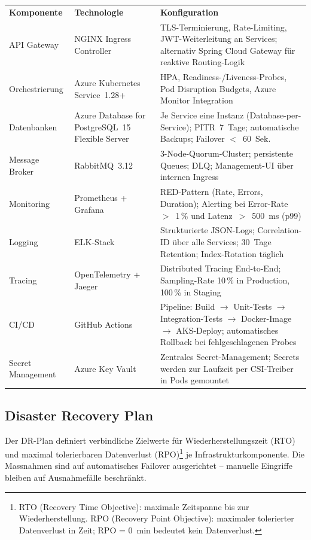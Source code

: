 \begin{tabularx}{\textwidth}{L{3.2cm} L{3cm} X}
  \color{white}\textbf{Komponente} & \color{white}\textbf{Technologie} & \color{white}\textbf{Konfiguration} \\
  API Gateway & NGINX Ingress Controller & TLS-Terminierung, Rate-Limiting, JWT-Weiterleitung an Services;
  alternativ Spring Cloud Gateway für reaktive Routing-Logik \\
  Orchestrierung & Azure Kubernetes Service~1.28+ & HPA, Readiness-/Liveness-Probes, Pod Disruption Budgets,
  Azure Monitor Integration \\
  Datenbanken & Azure Database for PostgreSQL~15 Flexible Server & Je Service eine Instanz (Database-per-Service);
  PITR~7~Tage; automatische Backups; Failover $<$~60~Sek. \\
  Message Broker & RabbitMQ~3.12 & 3-Node-Quorum-Cluster; persistente Queues; DLQ; Management-UI
  über internen Ingress \\
  Monitoring & Prometheus + Grafana & RED-Pattern (Rate, Errors, Duration); Alerting bei
  Error-Rate~$>$~1\,\% und Latenz~$>$~500~ms (p99) \\
  Logging & ELK-Stack & Strukturierte JSON-Logs; Correlation-ID über alle Services;
  30~Tage Retention; Index-Rotation täglich \\
  Tracing & OpenTelemetry + Jaeger & Distributed Tracing End-to-End; Sampling-Rate 10\,\%
  in Production, 100\,\% in Staging \\
  CI/CD & GitHub Actions & Pipeline: Build $\to$ Unit-Tests $\to$ Integration-Tests $\to$
  Docker-Image $\to$ AKS-Deploy; automatisches Rollback bei fehlgeschlagenen Probes \\
  Secret Management & Azure Key Vault & Zentrales Secret-Management; Secrets werden zur
  Laufzeit per CSI-Treiber in Pods gemountet \\
\end{tabularx}

\subsection{Disaster Recovery Plan}

Der DR-Plan definiert verbindliche Zielwerte für Wiederherstellungszeit (RTO) und
maximal tolerierbaren Datenverlust (RPO)\footnote{RTO (Recovery Time Objective):
maximale Zeitspanne bis zur Wiederherstellung. RPO (Recovery Point Objective):
maximaler tolerierter Datenverlust in Zeit; RPO = 0~min bedeutet kein Datenverlust.}
je Infrastrukturkomponente. Die Massnahmen sind auf automatisches Failover ausgerichtet
-- manuelle Eingriffe bleiben auf Ausnahmefälle beschränkt.

